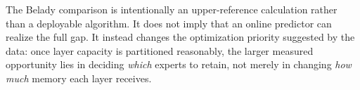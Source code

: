 The Belady comparison is intentionally an upper-reference calculation rather than a deployable algorithm. It does not imply that an online predictor can realize the full gap. It instead changes the optimization priority suggested by the data: once layer capacity is partitioned reasonably, the larger measured opportunity lies in deciding \emph{which} experts to retain, not merely in changing \emph{how much} memory each layer receives.
